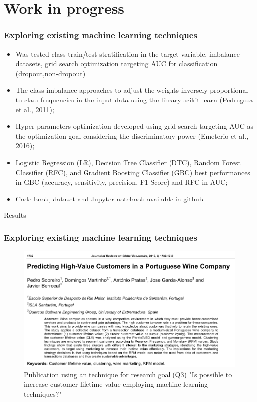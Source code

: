 \documentclass[10pt]{beamer}
\begin{document}
\section{Work in progress}
\begin{frame}
	\frametitle{Exploring existing machine learning techniques}
	\begin{itemize}
		\item Was tested class train/test stratification in the target variable, imbalance datasets, grid search optimization targeting AUC for classification (dropout,non-dropout);
		\item The class imbalance approaches to adjust the weights inversely proportional to class frequencies in the input data using the library scikit-learn (Pedregosa et al., 2011);
		\item Hyper-parameters optimization developed using grid search targeting AUC as the optimization goal considering the discriminatory power (Emeterio et al., 2016);
		\item Logistic Regression (LR), Decision Tree Classifier (DTC), Random Forest Classifier (RFC), and Gradient Boosting Classifier (GBC) best performances in GBC (accuracy, sensitivity, precision, F1 Score) and RFC in AUC;
		\item Code book, dataset and Jupyter notebook available in github \href{https://github.com/pesobreiro/dropoutPredFitness}{\color{red}{here}}.
	\end{itemize}
\end{frame}

\begin{frame}[fragile]{Results}
	\frametitle{Exploring existing machine learning techniques}
	\begin{figure}
		\includegraphics[scale=0.4]{../img/pub1.png}
		\caption{Publication using an technique for research goal (Q3) "Is possible to increase customer lifetime value employing machine learning techniques?"}
		\label{figure3}
	\end{figure}
\end{frame}
\end{document}
